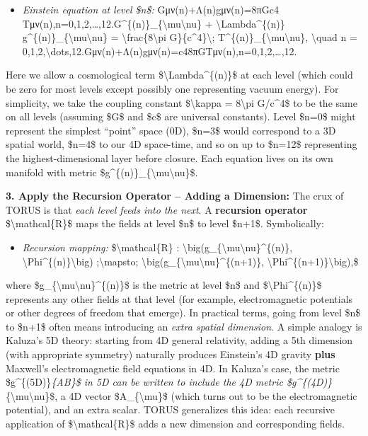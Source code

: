 \documentclass[]{article}
\begin{document}
\begin{itemize}
\item
  \emph{Einstein equation at level \$n\$:}
  Gμν(n)+Λ(n)gμν(n)=8πGc4  Tμν(n),n=0,1,2,\ldots{},12.G\^{}\{(n)\}\_\{\textbackslash{}mu\textbackslash{}nu\}
  + \textbackslash{}Lambda\^{}\{(n)\}
  g\^{}\{(n)\}\_\{\textbackslash{}mu\textbackslash{}nu\} =
  \textbackslash{}frac\{8\textbackslash{}pi
  G\}\{c\^{}4\}\textbackslash{};
  T\^{}\{(n)\}\_\{\textbackslash{}mu\textbackslash{}nu\},
  \textbackslash{}quad n =
  0,1,2,\textbackslash{}dots,12.Gμν(n)​+Λ(n)gμν(n)​=c48πG​Tμν(n)​,n=0,1,2,\ldots{},12.
\end{itemize}

Here we allow a cosmological term \$\textbackslash{}Lambda\^{}\{(n)\}\$
at each level (which could be zero for most levels except possibly one
representing vacuum energy). For simplicity, we take the coupling
constant \$\textbackslash{}kappa = 8\textbackslash{}pi G/c\^{}4\$ to be
the same on all levels (assuming \$G\$ and \$c\$ are universal
constants)​. Level \$n=0\$ might represent the simplest ``point'' space
(0D), \$n=3\$ would correspond to a 3D spatial world, \$n=4\$ to our 4D
space-time, and so on up to \$n=12\$ representing the
highest-dimensional layer before closure. Each equation lives on its own
manifold with metric
\$g\^{}\{(n)\}\_\{\textbackslash{}mu\textbackslash{}nu\}\$.

\textbf{3. Apply the Recursion Operator -- Adding a Dimension:} The crux
of TORUS is that \emph{each level feeds into the next}. A
\textbf{recursion operator} \$\textbackslash{}mathcal\{R\}\$ maps the
fields at level \$n\$ to level \$n+1\$. Symbolically​:

\begin{itemize}
\item
  \emph{Recursion mapping:} \$\textbackslash{}mathcal\{R\} :
  \textbackslash{}big(g\_\{\textbackslash{}mu\textbackslash{}nu\}\^{}\{(n)\},
  \textbackslash{}Phi\^{}\{(n)\}\textbackslash{}big)
  ;\textbackslash{}mapsto;
  \textbackslash{}big(g\_\{\textbackslash{}mu\textbackslash{}nu\}\^{}\{(n+1)\},
  \textbackslash{}Phi\^{}\{(n+1)\}\textbackslash{}big),\$
\end{itemize}

where \$g\_\{\textbackslash{}mu\textbackslash{}nu\}\^{}\{(n)\}\$ is the
metric at level \$n\$ and \$\textbackslash{}Phi\^{}\{(n)\}\$ represents
any other fields at that level (for example, electromagnetic potentials
or other degrees of freedom that emerge). In practical terms, going from
level \$n\$ to \$n+1\$ often means introducing an \emph{extra spatial
dimension}. A simple analogy is Kaluza's 5D theory: starting from 4D
general relativity, adding a 5th dimension (with appropriate symmetry)
naturally produces Einstein's 4D gravity \textbf{plus} Maxwell's
electromagnetic field equations in 4D​. In Kaluza's case, the metric
\$g\^{}\{(5D)\}\emph{\{AB\}\$ in 5D can be written to include the 4D
metric \$g\^{}\{(4D)\}}\{\textbackslash{}mu\textbackslash{}nu\}\$, a 4D
vector \$A\_\{\textbackslash{}mu\}\$ (which turns out to be the
electromagnetic potential), and an extra scalar. TORUS generalizes this
idea: each recursive application of \$\textbackslash{}mathcal\{R\}\$
adds a new dimension and corresponding fields.
\end{document}
